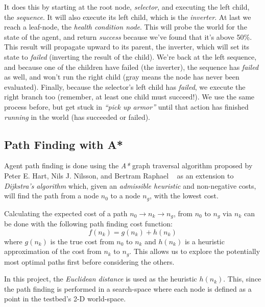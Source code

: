 \documentclass[a4paper, twocolumn]{article}
\begin{document}
        It does this by starting at the root node, \emph{selector}, and executing the left child, the \emph{sequence}. It will also execute its left child, which is the \emph{inverter}. At last we reach a leaf-node, the \emph{health condition node}. This will probe the world for the state of the agent, and return \emph{success} because we've found that it's above 50\%. This result will propagate upward to its parent, the inverter, which will set its state to \emph{failed} (inverting the result of the child). We're back at the left sequence, and because one of the children have failed (the inverter), the sequence has \emph{failed} as well, and won't run the right child (gray means the node has never been evaluated). Finally, because the selector's left child has \emph{failed}, we execute the right branch too (remember, at least one child must succeed!). We use the same process before, but get stuck in \emph{``pick up armor''} until that action has finished \emph{running} in the world (has succeeded or failed).

        \subsection{Path Finding with A*} \label{sec:path_finding}

	Agent path finding is done using the \emph{A*} graph traversal algorithm proposed by Peter E. Hart, Nils J. Nilsson, and Bertram Raphael ~\cite{hart1968formal} as an extension to \emph{Dijkstra's algorithm} which, given an \emph{admissible heuristic} and non-negative costs, will find the path from a node \(n_0\) to a node \(n_g\), with the lowest cost.
	
    Calculating the expected cost of a path \(n_0 \rightarrow n_k \rightarrow n_g\), from \(n_0\) to \(n_g\) via \(n_k\) can be done with the following path finding cost function:
	\begin{equation*}
		f(n_k) = g(n_k) + h(n_k)
	\end{equation*}	
	where \(g(n_k)\) is the true cost from \(n_0\) to \(n_k\) and \(h(n_k)\) is a heuristic approximation of the cost from \(n_k\) to \(n_g\). This allows us to explore the potentially most optimal paths first before considering the others.

        In this project, the \emph{Euclidean distance} is used as the heuristic \(h(n_k)\). This, since the path finding is performed in a search-space where each node is defined as a point in the testbed's 2-D world-space.
\end{document}
